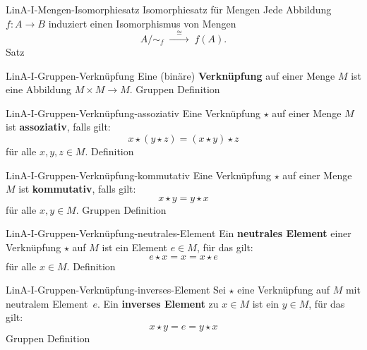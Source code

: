 \documentclass[10pt]{article}
\begin{document}
\begin{note}{LinA-I-Mengen-Isomorphiesatz}
\field Isomorphiesatz für Mengen
\field
    Jede Abbildung \(f\colon A\longrightarrow B\) induziert einen Isomorphismus von Mengen
    \[
      A/\!\sim_f \;\xrightarrow{\quad\cong\quad}\; f(A).
    \]
    \clend
    \field
    \field Satz
\end{note}


\begin{note}{LinA-I-Gruppen-Verknüpfung}
  \field
  \field
  Eine (binäre) \textbf{Verknüpfung} auf einer Menge \(M\) ist eine Abbildung \(M\times M\to M\).\clend
  \field
  \field Gruppen
  \field Definition
\end{note}

\begin{note}{LinA-I-Gruppen-Verknüpfung-assoziativ}
  \field
  \field
  Eine Verknüpfung \(\star\) auf einer Menge \(M\) ist \textbf{assoziativ}, falls gilt:
  \[
    x\star(y\star z) = (x\star y)\star z
  \]
  für alle \(x,y,z \in M\).
  \clend
  \field
  \field Definition
\end{note}

\begin{note}{LinA-I-Gruppen-Verknüpfung-kommutativ}
  \field
  \field
  Eine Verknüpfung \(\star\) auf einer Menge \(M\) ist \textbf{kommutativ}, falls gilt:
  \[
    x\star y = y\star x
  \]
  für alle \(x,y \in M\).
  \clend
  \field
  \field Gruppen
  \field Definition
\end{note}

\begin{note}{LinA-I-Gruppen-Verknüpfung-neutrales-Element}
  \field
  \field
    Ein \textbf{neutrales Element} einer Verknüpfung \(\star\) auf \(M\) ist ein Element \(e\in M\), für das gilt:
    \[
      e\star x = x = x\star e
    \]
    für alle \(x\in M\).
    \clend
\field Definition
\end{note}

\begin{note}{LinA-I-Gruppen-Verknüpfung-inverses-Element}
  \field
  \field
  Sei \(\star\) eine Verknüpfung auf \(M\) mit neutralem Element~\(e\). 
  Ein \textbf{inverses Element} zu \(x\in M\) ist ein \(y\in M\), für das gilt:
  \[
    x\star y = e = y\star x
  \]
  \clend
  \field
  \field Gruppen
  \field Definition  
\end{note}
\end{document}
